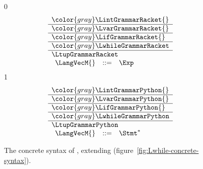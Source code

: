 \documentclass[7x10]{TimesAPriori_MIT}%
\newcommand{\gray}[1]{{\color{gray} #1}}
\def\racketEd{0}
\def\pythonEd{1}
\providecommand{\BookEdition}{1}
\let\edition\BookEdition
\newcommand{\pythonColor}[0]{}
\numberwithin{theorem}{chapter}
\numberwithin{definition}{chapter}
\numberwithin{equation}{chapter}
\begin{document}
  
\begin{figure}[tbp]
\centering
\begin{tcolorbox}[colback=white]    
    \small
{\if\edition\racketEd    
\[
\begin{array}{l}
  \gray{\LintGrammarRacket{}} \\ \hline
  \gray{\LvarGrammarRacket{}} \\ \hline
  \gray{\LifGrammarRacket{}} \\ \hline
  \gray{\LwhileGrammarRacket} \\ \hline
  \LtupGrammarRacket \\  
  \begin{array}{lcl}
    \LangVecM{} &::=& \Exp
  \end{array}
\end{array}
\]
\fi}
{\if\edition\pythonEd\pythonColor
\[
\begin{array}{l}
  \gray{\LintGrammarPython{}} \\ \hline
  \gray{\LvarGrammarPython{}} \\ \hline
  \gray{\LifGrammarPython{}} \\ \hline
  \gray{\LwhileGrammarPython} \\ \hline
  \LtupGrammarPython \\  
\begin{array}{rcl}
  \LangVecM{} &::=& \Stmt^{*}
\end{array}
\end{array}
\]
\fi}
\end{tcolorbox}
\caption{The concrete syntax of \LangVec{}, extending \LangLoop{}
  (figure~\ref{fig:Lwhile-concrete-syntax}).}
\label{fig:Lvec-concrete-syntax}
\end{figure}
\end{document}
